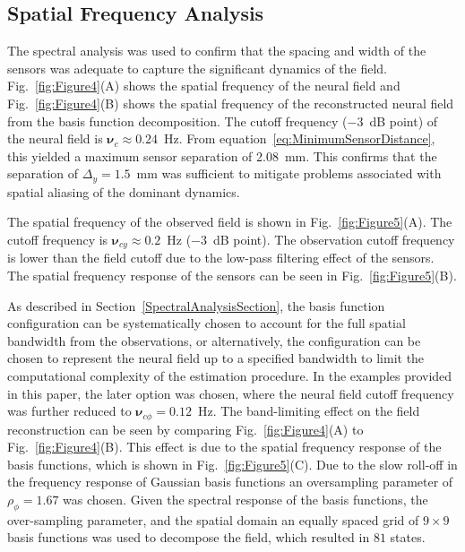 \documentclass[5p,authoryear]{elsarticle}
\begin{document}
\subsection{Spatial Frequency Analysis}
The spectral analysis was used to confirm that the spacing and width of the sensors was adequate to capture the significant dynamics of the field. Fig.~\ref{fig:Figure4}(A) shows the spatial frequency of the neural field and Fig.~\ref{fig:Figure4}(B) shows the spatial frequency of the reconstructed neural field from the basis function decomposition. The cutoff frequency ($-3$~dB point) of the neural field is $\boldsymbol{\nu}_c \approx 0.24$~Hz. From equation~\ref{eq:MinimumSensorDistance}, this yielded a maximum sensor separation of 2.08~mm. This confirms that the separation of $\Delta_{y} = 1.5$~mm was sufficient to mitigate problems associated with spatial aliasing of the dominant dynamics.

The spatial frequency of the observed field is shown in Fig.~\ref{fig:Figure5}(A). The cutoff frequency is $\boldsymbol{\nu}_{cy} \approx 0.2$~Hz ($-3$~dB point). The observation cutoff frequency is lower than the field cutoff due to the low-pass filtering effect of the sensors. The spatial frequency response of the sensors can be seen in Fig.~\ref{fig:Figure5}(B). 

As described in Section~\ref{SpectralAnalysisSection}, the basis function configuration can be systematically chosen to account for the full spatial bandwidth from the observations, or alternatively, the configuration can be chosen to represent the neural field up to a specified bandwidth to limit the computational complexity of the estimation procedure. In the examples provided in this paper, the later option was chosen, where the neural field cutoff frequency was further reduced to $\boldsymbol{\nu}_{c\phi} = 0.12$~Hz. The band-limiting effect on the field reconstruction can be seen by comparing Fig.~\ref{fig:Figure4}(A) to Fig.~\ref{fig:Figure4}(B). This effect is due to the spatial frequency response of the basis functions, which is shown in Fig.~\ref{fig:Figure5}(C). Due to the slow roll-off in the frequency response of Gaussian basis functions an oversampling parameter of $\rho_{\phi} = 1.67$ was chosen. Given the spectral response of the basis functions, the over-sampling parameter, and the spatial domain an equally spaced grid of $9\times9$ basis functions was used to decompose the field, which resulted in $81$ states. %
\end{document}
